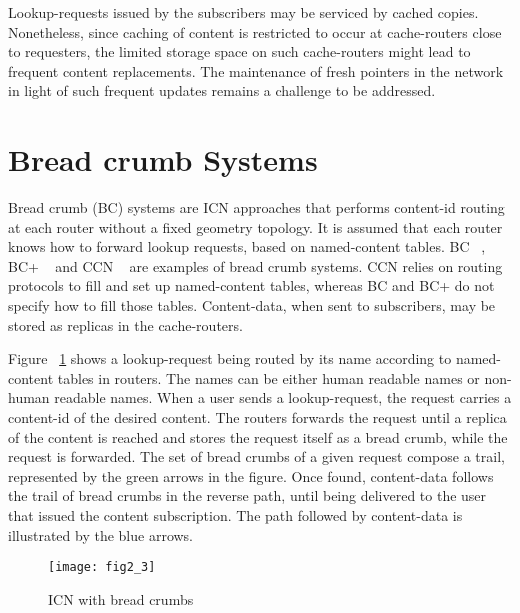 Lookup-requests issued by the subscribers may be serviced by cached copies.  
Nonetheless, since 
caching of content is restricted to occur at cache-routers close to requesters,
  the limited storage space on such cache-routers might lead to frequent content replacements.
The maintenance of fresh pointers in the network in light of such frequent updates remains a challenge to be addressed.



\begin{comment}
These frequent replacements, in turn, might cause pointers to such contents, stored in other routers in the network, to rapidly stale. 
so to allow the discovery of such copies can point to copies that have already been replaced at those caches,
by newer copies, because of 
\end{comment}




\section {Bread crumb Systems}

Bread crumb (BC) systems are ICN approaches that performs content-id routing at each router without a fixed geometry topology. 
It is assumed that each router knows how to forward lookup requests, based on named-content tables. BC ~\cite{elisha2}, BC+ ~\cite{bc+}
and CCN ~\cite{ccn1} are examples of bread crumb systems. CCN relies on routing protocols to fill and set up named-content tables, 
whereas BC and BC+ do not specify how to fill those tables. Content-data, when sent to subscribers, may be stored as 
replicas in the cache-routers.  


Figure ~\ref{systemicnbread} shows a lookup-request being routed by its name according to named-content tables in routers. 
The names 
can be either human readable names or non-human readable names. When a user sends a lookup-request, the request carries
a content-id of the desired content. The routers forwards the request until a replica of
the content is reached and stores the request itself as a bread crumb, while the request is forwarded. 
The set of bread crumbs of a given request compose
a trail, represented by the green arrows in the figure. Once found, content-data follows the trail of bread crumbs
in the reverse path, until being delivered to the user that issued the content subscription. The path followed
by content-data is illustrated by the blue arrows.


\begin{figure}
\center
\texttt{[image: fig2\_3]}
\caption{ICN with bread crumbs}
\label{systemicnbread}
\end{figure}



